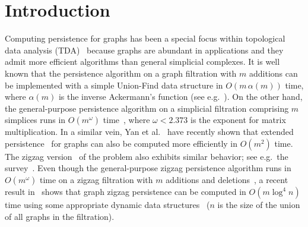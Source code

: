 \documentclass[letterpaper,11pt]{article}
\theoremstyle{mythmstyle}
\theoremstyle{mydefstyle}
\theoremstyle{plain}
\theoremstyle{definition}
\newcommand{\<}[1]{\langle #1\rangle}
\theoremstyle{definition}
\begin{document}
\section{Introduction}
Computing persistence for graphs has been a special focus
within topological data analysis (TDA)~\cite{DW22,edelsbrunner2010computational} because graphs are
abundant in applications and they admit more efficient
algorithms than general simplicial complexes. It is well known that the
persistence algorithm on a graph filtration with $m$ additions
can be implemented with 
a simple 
Union-Find
data structure in $O(m\,\alpha(m))$ time, where $\alpha(m)$
is the inverse Ackermann's function (see e.g.~\cite{DW22}).
On the other hand, the general-purpose persistence algorithm on a simplicial
filtration comprising $m$ simplices runs in $O(m^\omega)$ time~\cite{milosavljevic2011zigzag},
where $\omega< 2.373$ is the exponent for matrix multiplication.
In a similar vein, Yan et al.~\cite{yan2021link} have recently shown that 
extended persistence~\cite{cohen2009extending} for graphs can also be computed more efficiently
in $O(m^2)$ time.
The zigzag version~\cite{carlsson2010zigzag} of the problem also exhibits similar
behavior; see e.g.\ the survey~\cite{berkouk22}. Even though the general-purpose zigzag persistence
algorithm runs in $O(m^\omega)$ time on a zigzag filtration
with $m$ additions and deletions~\cite{carlsson2009zigzag-realvalue,DBLP:conf/esa/DeyH22,maria2014zigzag,milosavljevic2011zigzag},
a recent result in~\cite{dey2021computing} shows that graph zigzag persistence
can be computed in 
$O(m\log^4n)$ 
time using some
appropriate dynamic data structures~\cite{georgiadis2011data,holm2001poly}
($n$ is the size of the union of all graphs in the filtration).
\end{document}
